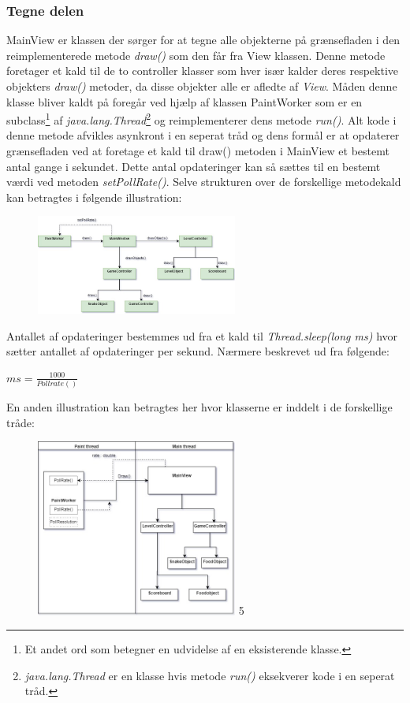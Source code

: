 \documentclass[]{article}
\begin{document}
\subsubsection{Tegne delen}

MainView er klassen der sørger for at  tegne alle objekterne på grænsefladen i den reimplementerede metode \textit{draw()} som den får fra View klassen. Denne metode foretager et kald til de to controller klasser som hver især kalder deres respektive objekters \textit{draw()} metoder, da disse objekter alle er afledte af \textit{View}. Måden denne klasse bliver kaldt på foregår ved hjælp af klassen PaintWorker som er en subclass\footnote{Et andet ord som betegner en udvidelse af en eksisterende klasse.} af \textit{java.lang.Thread}\footnote{\textit{java.lang.Thread} er en klasse hvis metode \textit{run()} eksekverer kode i en seperat tråd.}  og reimplementerer dens metode \textit{run()}. Alt kode i denne metode afvikles asynkront i en seperat tråd og dens formål er at opdaterer grænsefladen ved at foretage et kald til draw() metoden i MainView et bestemt antal gange i sekundet. Dette antal opdateringer kan så sættes til en bestemt værdi ved metoden \textit{setPollRate()}. Selve strukturen over de forskellige metodekald kan betragtes i følgende illustration:

\begin{figure}[h!]
	\centering
	\includegraphics[width=250px]{Draw_sequence.jpg}
	\label{fig:diagram2}
\end{figure}

Antallet af opdateringer bestemmes ud fra et kald til \textit{Thread.sleep(long ms)} hvor sætter antallet af opdateringer per sekund. Nærmere beskrevet ud fra følgende:

\begin{center}
	$ ms = \frac{1000}{Pollrate()}  $
\end{center}

\pagebreak
En anden illustration kan betragtes her hvor klasserne er inddelt i de forskellige tråde:

\begin{figure}[h!]
	\centering
	\includegraphics[width=250px]{Thread_diagram.jpg}
	\label{fig:thread}5
\end{figure}
\end{document}

